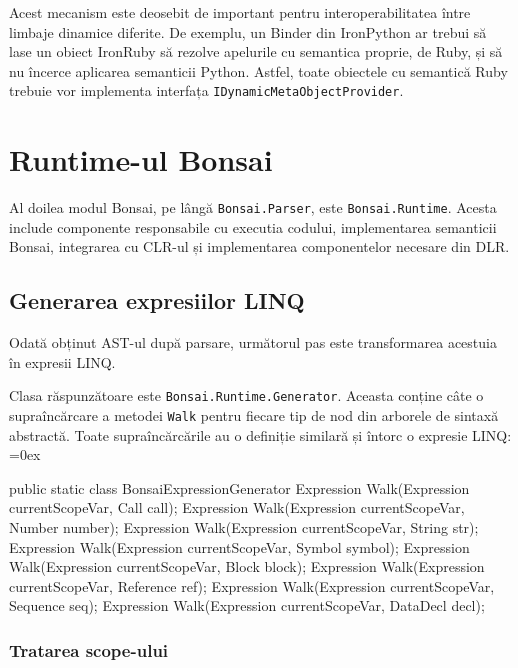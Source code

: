 \documentclass[12pt,a4paper]{memoir}
\renewcommand{\c}{\texttt}
\newenvironment{code}
{
\definecolor{shadecolor}{gray}{0.91}
\topsep=0ex
\relax
\shaded
\verbatim
}
{
\endverbatim
\endshaded
}
\begin{document}
Acest mecanism este deosebit de important pentru interoperabilitatea între limbaje dinamice diferite. De exemplu, un Binder din IronPython ar trebui să lase un obiect IronRuby să rezolve apelurile cu semantica proprie, de Ruby, și să nu încerce aplicarea semanticii Python. Astfel, toate obiectele cu semantică Ruby trebuie vor implementa interfața \c{IDynamicMetaObjectProvider}.

\chapter{Runtime-ul Bonsai}

Al doilea modul Bonsai, pe lângă \c{Bonsai.Parser}, este \c{Bonsai.Runtime}. Acesta include componente responsabile cu executia codului, implementarea semanticii Bonsai, integrarea cu CLR-ul și implementarea componentelor necesare din DLR.

\section{Generarea expresiilor LINQ}

Odată obținut AST-ul după parsare, următorul pas este transformarea acestuia în expresii LINQ\cite{linq_expressions}. 

Clasa răspunzătoare este \c{Bonsai.Runtime.Generator}. Aceasta conține câte o supraîncărcare a metodei \c{Walk} pentru fiecare tip de nod din arborele de sintaxă abstractă. Toate supraîncărcările au o definiție similară și întorc o expresie LINQ:
\begin{code}
public static class BonsaiExpressionGenerator {
  Expression Walk(Expression currentScopeVar, Call call);       
  Expression Walk(Expression currentScopeVar, Number number);
  Expression Walk(Expression currentScopeVar, String str);
  Expression Walk(Expression currentScopeVar, Symbol symbol);
  Expression Walk(Expression currentScopeVar, Block block);
  Expression Walk(Expression currentScopeVar, Reference ref);
  Expression Walk(Expression currentScopeVar, Sequence seq);
  Expression Walk(Expression currentScopeVar, DataDecl decl);
}
\end{code}

\subsection{Tratarea scope-ului}\label{sec:ScopeManagement}
\end{document}
